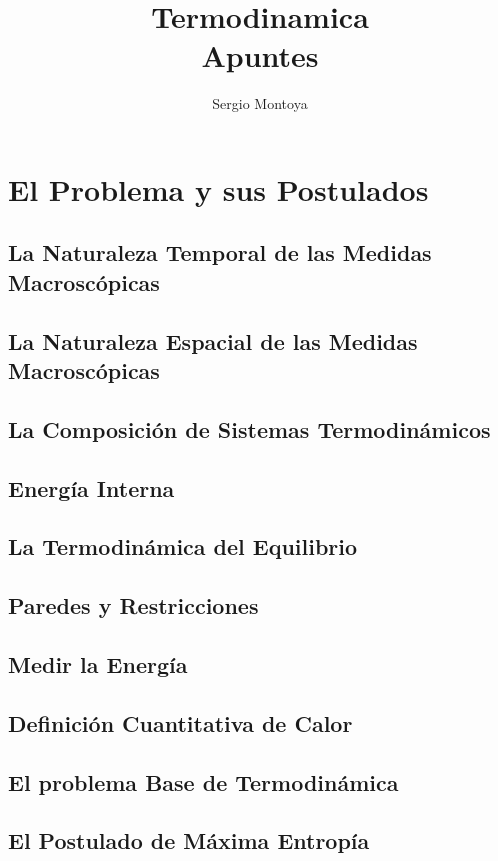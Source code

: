 \documentclass{report}
\title{\Huge{Termodinamica}\\Apuntes}
\author{\huge{Sergio Montoya}}
\date{}
\begin{document}
\maketitle
\newpage%
\tableofcontents
\pagebreak

\chapter{El Problema y sus Postulados} \section{La Naturaleza Temporal de las Medidas Macroscópicas}\label{1.1}
\section{La Naturaleza Espacial de las Medidas Macroscópicas}\label{1.2}
\section{La Composición de Sistemas Termodinámicos}\label{1.3}
\section{Energía Interna}\label{1.4}
\section{La Termodinámica del Equilibrio}\label{1.5}
\section{Paredes y Restricciones}\label{1.6}
\section{Medir la Energía}\label{1.7}
\section{Definición Cuantitativa de Calor}\label{1.8}
\section{El problema Base de Termodinámica}\label{1.9}
\section{El Postulado de Máxima Entropía}\label{1.10}
\end{document}
